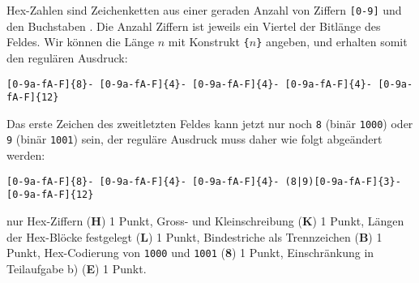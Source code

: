 \begin{loesung}
\begin{teilaufgaben}
\item
Hex-Zahlen sind Zeichenketten aus einer geraden Anzahl von
Ziffern \texttt{[0-9]} und den Buchstaben \text{[a-fA-F]}.
Die Anzahl Ziffern ist jeweils ein Viertel der Bitlänge des Feldes.
Wir können die Länge $n$ mit Konstrukt \texttt{\{$n$\}} angeben,
und erhalten somit den regulären Ausdruck:
\begin{center}
\texttt{[0-9a-fA-F]\{8\}-%
[0-9a-fA-F]\{4\}-%
[0-9a-fA-F]\{4\}-%
[0-9a-fA-F]\{4\}-%
[0-9a-fA-F]\{12\}}
\end{center}
\item
Das erste Zeichen des zweitletzten Feldes kann jetzt nur noch
\texttt{8} (binär \texttt{1000}) oder \texttt{9} (binär \texttt{1001})
sein, der reguläre Ausdruck muss daher wie folgt abgeändert
werden:
\begin{center}
\texttt{[0-9a-fA-F]\{8\}-%
[0-9a-fA-F]\{4\}-%
[0-9a-fA-F]\{4\}-%
(8|9)[0-9a-fA-F]\{3\}-%
[0-9a-fA-F]\{12\}}
\end{center}
\qedhere
\end{teilaufgaben}
\end{loesung}

\begin{bewertung}
nur Hex-Ziffern ({\bf H}) 1 Punkt,
Gross- und Kleinschreibung ({\bf K}) 1 Punkt,
Längen der Hex-Blöcke festgelegt ({\bf L}) 1 Punkt,
Bindestriche als Trennzeichen ({\bf B}) 1 Punkt,
Hex-Codierung von \texttt{1000} und \texttt{1001} ({\bf 8}) 1 Punkt,
Einschränkung in Teilaufgabe b) ({\bf E}) 1 Punkt.
\end{bewertung}

